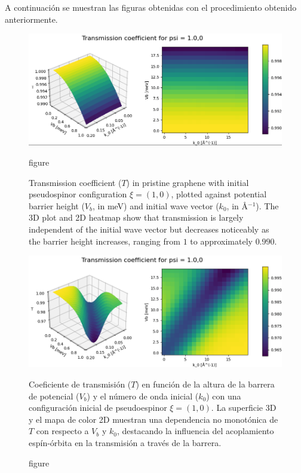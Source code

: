 A continuación se muestran las figuras obtenidas con el procedimiento obtenido anteriormente.

\begin{figure}[h!]
    \centering
    \begin{minipage}[t]{0.48\textwidth}
        \centering
        \includegraphics[width=\textwidth]{../assets/images/No-Rashba/TCoefficient(1.0,0)xalpha=0beta=0}
        \caption{figure}{
            Transmission coefficient ($T$) in pristine graphene with initial pseudospinor configuration $\xi = (1, 0)$, plotted against potential barrier height ($V_b$, in meV) and initial wave vector ($k_0$, in \AA$^{-1}$). The 3D plot and 2D heatmap show that transmission is largely independent of the initial wave vector but decreases noticeably as the barrier height increases, ranging from $1$ to approximately $0.990$.
        }
        \label{fig:noRashba}
    \end{minipage}
    \hfill
    \begin{minipage}[t]{0.48\textwidth}
        \centering
        \includegraphics[width=\textwidth]{../assets/images/Rashba/TCoefficient(1.0,0)xalpha=0.2beta=-0.2}
        \caption{figure}{
            Coeficiente de transmisión ($T$) en función de la altura de la barrera de potencial ($V_b$) y el número de onda inicial ($k_0$) con una configuración inicial de pseudoespinor $\xi = (1, 0)$. La superficie 3D y el mapa de color 2D muestran una dependencia no monotónica de $T$ con respecto a $V_b$ y $k_0$, destacando la influencia del acoplamiento espín-órbita en la transmisión a través de la barrera.
        }
        \label{fig:rashba}
    \end{minipage}
\end{figure}

